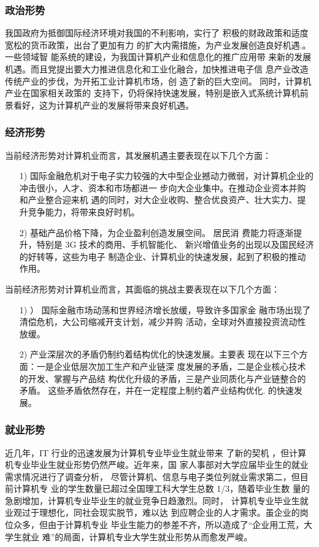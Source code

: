 \documentclass{article}
\begin{document}
\subsubsection{政治形势}\par
我国政府为抵御国际经济环境对我国的不利影响，实行了 积极的财政政策和适度宽松的货币政策，出台了更加有力 的扩大内需措施，为产业发展创造良好机遇.。一些领域智 能系统的建设，为我国计算机产业和信息化的推广应用带 来新的发展机遇。而且党提出要大力推进信息化和工业化融合，加快推进电子信 息产业改造传统产业的步伐，为开拓工业计算机市场，创 造了新的巨大空间。 同时，计算机产业在国家相关政策的 支持下，仍将保持快速发展，特别是嵌入式系统计算机前 景看好，这为计算机产业的发展将带来良好机遇。
\subsubsection{经济形势}\par
当前经济形势对计算机业而言，其发展机遇主要表现在以下几个方面：
\begin{itemize}
		\item [1) ] 国际金融危机对于电子实力较强的大中型企业撼动力微弱，对计算机企业的冲击很小，人才、资本和市场都进一 步向大企业集中。在推动企业资本并购和产业整合迎来机 遇的同时，对大企业收购、整合优良资产、壮大实力、提 升竞争能力，将带来良好时机。 
		\item [2) ]基础产品价格下降，为企业盈利创造发展空间。 居民消 费能力将逐渐提升，特别是 3G 技术的商用、手机智能化、 新兴增值业务的出现以及国民经济的好转等，这些为电子 制造企业、计算机业的快速发展，起到了积极的推动作用。  
\end{itemize}
当前经济形势对计算机业而言，其面临的挑战主要表现在以下几个方面：
\begin{itemize} 
	\item [1) ]） 国际金融市场动荡和世界经济增长放缓，导致许多国家金 融市场出现了清偿危机，大公司缩减开支计划，减少并购 活动，全球对外直接投资流动性放缓。 
	\item [2) ] 产业深层次的矛盾仍制约着结构优化的快速发展。主要表 现在以下三个方面：一是企业低层次加工生产和产业链深 度发展的矛盾，二是企业核心技术的开发、掌握与产品结 构优化升级的矛盾，三是产业同质化与产业链整合的矛盾。 这些矛盾依然存在，并在一定程度上制约着产业结构优化.
	的快速发展。 
\end{itemize}
\subsubsection{就业形势}\par
近几年，IT 行业的迅速发展为计算机专业毕业生就业带来
了新的契机 ，但计算机专业毕业生就业形势仍然严峻。近年来，国
家人事部对大学应届毕业生的就业需求情况进行了调查分析，
尽管计算机、信息与电子类位列就业需求第二，但目前计算机专
业的学生数量已超过全国理工科大学生总数 1/3，随着毕业生数
量的急剧增加，计算机专业毕业生的就业竞争日趋激烈。同时，
计算机专业毕业生就业观过于理想化，同社会现实脱节，难以达
到应聘企业的人才需求。虽企业的岗位众多，但由于计算机专业
毕业生能力的参差不齐，所以造成了“企业用工荒，大学生就业
难”的局面，计算机专业大学生就业形势从而愈发严峻。
\end{document}
